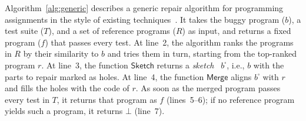 \documentclass[10pt,conference]{IEEEtran}
\begin{document}
Algorithm~\ref{alg:generic} describes a generic repair algorithm for programming assignments in the style of existing techniques~\cite{gulwani2018automated, wang2018search, hu2019re}. It takes the buggy program ($b$), a test suite ($T$), and a set of reference programs ($R$) as input, and returns a fixed program ($f$) that passes every test. At line~2, the algorithm ranks the programs in $R$ by their similarity to $b$ and tries them in turn, starting from the top-ranked program $r$. At line~3, the function $\mathsf{Sketch}$ returns a \emph{sketch}~\cite{solar2006combinatorial} $b^{\square}$, i.e., $b$ with the parts to repair marked as holes. At line~4, the function $\mathsf{Merge}$ aligns $b^{\square}$ with $r$ and fills the holes with the code of $r$. As soon as the merged program passes every test in $T$, it returns that program as $f$ (lines~5--6); if no reference program yields such a program, it returns $\bot$ (line~7).
\end{document}
